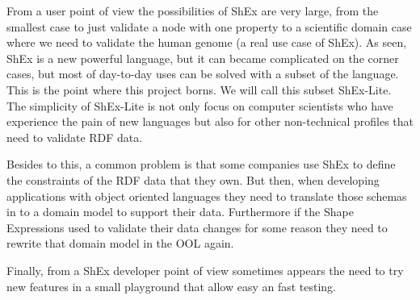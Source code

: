 From a user point of view the possibilities of ShEx are very large, from the smallest case to just validate a node with one property to a scientific domain case where we need to validate the human genome (a real use case of ShEx). As seen, ShEx is a new powerful language, but it can became complicated on the corner cases, but most of day-to-day uses can be solved with a subset of the language. This is the point where this project borns. We will call this subset ShEx-Lite. The simplicity of ShEx-Lite is not only focus on computer scientists who have experience the pain of new languages but also for other non-technical profiles that need to validate RDF data.

Besides to this, a common problem is that some companies use ShEx to define the constraints of the RDF data that they own. But then, when developing applications with object oriented languages they need to translate those schemas in to a domain model to support their data. Furthermore if the Shape Expressions used to validate their data changes for some reason they need to rewrite that domain model in the OOL again.

Finally, from a ShEx developer point of view sometimes appears the need to try new features in a small playground that allow easy an fast testing.
